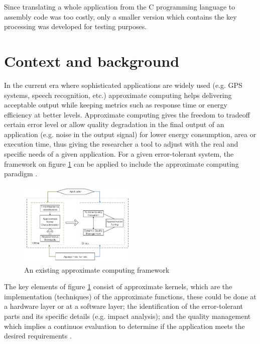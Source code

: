 \documentclass[conference]{IEEEtran}
\begin{document}
Since translating a whole application from the C programming language to assembly
code was too costly, only a smaller version which contains the key processing
was developed for testing purposes. 


\section{Context and background}

In the current era where sophisticated applications are widely used (e.g. GPS systems, 
speech recognition, etc.) approximate computing helps delivering acceptable
output while keeping metrics such as response time or energy efficiency at better levels. 
Approximate computing gives the freedom to tradeoff certain error level or allow quality degradation in the final output
of an application (e.g. noise in the output signal) for lower energy consumption, area or execution time, thus
giving the researcher a tool to adjust with the real and specific needs of a given application.
For a given error-tolerant system, the framework on figure \ref{fig:ap} can be applied to 
include the approximate computing paradigm \cite{xu2018approximate}.

\begin{figure}
\begin{center}
 \includegraphics[width=0.5\textwidth]{APframework}
 \caption{An existing approximate computing framework \cite{xu2018approximate}} \label{fig:ap}
 \end{center}
\end{figure}

The key elements of figure \ref{fig:ap} consist of approximate kernels, which are
the implementation (techniques) of the approximate functions, these could be done at a hardware layer or at
a software layer; the identification of the error-tolerant parts
and its specific details (e.g. impact analysis); and the quality management which implies a continuos evaluation to determine
if the application meets the desired requirements \cite{xu2018approximate}.
\end{document}
